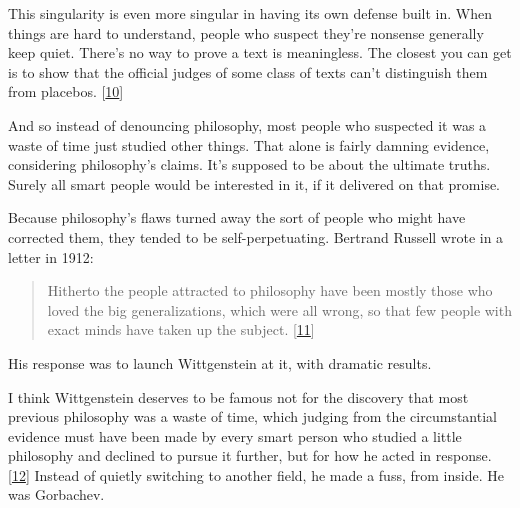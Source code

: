 This singularity is even more singular in
                  having its own defense built in. When things are hard to
                  understand, people who suspect they're nonsense generally keep
                  quiet. There's no way to prove a text is meaningless. The
                  closest you can get is to show that the official judges of
                  some class of texts can't distinguish them from placebos.
                  [\href{\#f10n}{10}]

And so instead of denouncing philosophy, most
                  people who suspected it was a waste of time just studied other
                  things. That alone is fairly damning evidence, considering
                  philosophy's claims. It's supposed to be about the ultimate
                  truths. Surely all smart people would be interested in it, if
                  it delivered on that promise.

Because philosophy's
                  flaws turned away the sort of people who might have corrected
                  them, they tended to be self-perpetuating. Bertrand Russell
                  wrote in a letter in 1912:
                  \begin{quote}

                    Hitherto the people attracted to philosophy have been mostly
                    those who loved the big generalizations, which were all
                    wrong, so that few people with exact minds have taken up the
                    subject.
                    [\href{\#f11n}{11}]
                  
\end{quote}

                  His response was to launch Wittgenstein at it, with dramatic
                  results.

I think Wittgenstein deserves to be famous
                  not for the discovery that most previous philosophy was a
                  waste of time, which judging from the circumstantial evidence
                  must have been made by every smart person who studied a little
                  philosophy and declined to pursue it further, but for how he
                  acted in response.
                  [\href{\#f12n}{12}]
                  Instead of quietly switching to another field, he made a fuss,
                  from inside. He was Gorbachev.


